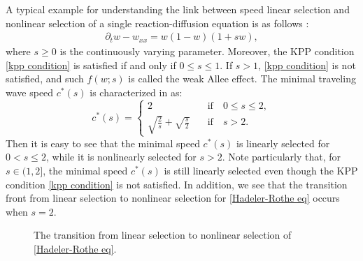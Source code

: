 \documentclass[11pt,a4paper]{article}
\numberwithin{equation}{section}
\numberwithin{figure}{section}
\newcommand\dps{\displaystyle}
\newcommand\bea{\begin{eqnarray}}
\newcommand\eea{\end{eqnarray}}
\begin{document}
A typical example
for understanding the link between speed linear selection and nonlinear selection of a single reaction-diffusion equation
is as follows %
\cite{Hadeler Rothe}:
\bea\label{Hadeler-Rothe eq}
\partial_t w-w_{xx}=w(1-w)(1+sw),
\eea
where $s\geq 0$ is the continuously varying parameter.  Moreover, the KPP condition \eqref{kpp condition} is satisfied if and only if $0\le s\le 1$.
If $s>1$, \eqref{kpp condition} is not satisfied, and such %
$f(w;s)$
is called the weak Allee effect.
The minimal traveling wave speed $c^*(s)$ is characterized in \cite{Hadeler Rothe} as:
\begin{equation*}
c^*(s)=
\begin{cases}
\dps 2&\quad\text{if}\quad 0\le s\le 2,\\
\dps \sqrt{\frac{2}{s}}+\sqrt{\frac{s}{2}}&\quad\text{if}\quad s>2.
\end{cases}
\end{equation*}
Then it is easy to see that the minimal speed  $c^*(s)$ is linearly selected for $0<s\le2$, while it is nonlinearly selected for $s>2$. Note particularly that, for $s\in(1,2]$, the minimal speed $c^*(s)$ is still linearly selected
even though the KPP condition \eqref{kpp condition} is not satisfied. 
In addition, we see that the transition front from linear selection to nonlinear selection for \eqref{Hadeler-Rothe eq} occurs when $s=2$.

\begin{figure}
\begin{center}
\caption{The transition from linear selection to nonlinear selection of \eqref{Hadeler-Rothe eq}.}
\end{center}
\end{figure}
\end{document}
